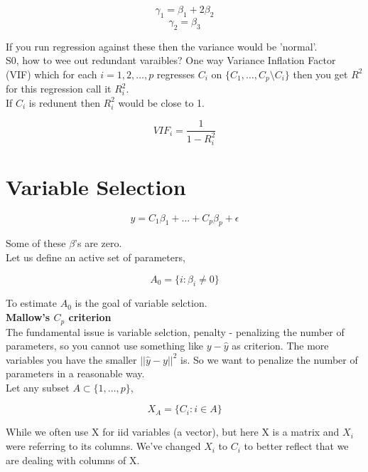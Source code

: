 \documentclass[11pt,fleqn]{book} %
\begin{document}
	$$ \gamma_1 = \beta_1 + 2\beta_2$$
	$$ \gamma_2 = \beta_3$$ 

	If you run regression against these then the variance would be 'normal'.\\

	S0, how to wee out redundant varaibles? One way Variance Inflation Factor (VIF) which for each $ i = 1, 2, \dots, p$ regresses $C_i$ on $\{C_1, \dots, C_p \setminus C_i \}$
then you get $R^2$ for this regression call it $R_i^2$.\\

If $C_i$ is redunent then $R_i^2$ would be close to 1. 

$$VIF_i = \frac{1}{1 - R_i^2} $$










\section{Variable Selection}

$$ y = C_1\beta_1 + \dots + C_p\beta_p + \epsilon$$

Some of these $\beta$'s are zero. \\

Let us define an active set of parameters, 

$$A_0 = \{i: \beta_i \neq 0 \}$$

To estimate $A_0$ is the goal of variable selction. \\

\textbf{Mallow's $C_p$ criterion}\\

The fundamental issue is variable selction, penalty - penalizing the number of parameters, so you cannot use something like $y - \hat{y}$ as criterion. The more variables you have the smaller $||\hat{y} - y ||^2$ is. So we want to penalize the number of parameters in a reasonable way. \\

Let any subset $A \subset \{1, \dots, p\}$, 

$$X_A = \{C_i: i \in A \}$$

\begin{notation}
	While we often use X  for iid variables (a vector), but here X is a matrix and $X_i$ were referring to its columns. We've changed $X_i$ to $C_i$ to better reflect that we are dealing with columns of X. 
\end{notation}
\end{document}

